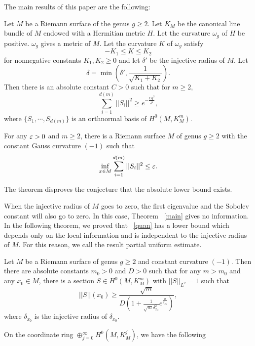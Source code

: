 The main results of this paper are the following:

\begin{theorem}\label{main}
Let $M$ be a Riemann surface of the genus $g\geq 2$. Let $K_M$ be the
canonical line  bundle of $M$ endowed with a Hermitian metric $H$. Let 
the curvature $\omega_g$ of $H$ be positive. $\omega_g$ gives a \ka
metric of $M$. Let the curvature $K$ of $\omega_g$ satisfy
\[
-K_1\leq K\leq K_2
\]
for nonnegative constants $K_1, K_2\geq 0$ and let $\delta'$ be the 
injective radius of $M$. Let
\[
\delta=\min(\delta',\frac{1}{\sqrt{K_1+K_2}}).
\]
Then there is an absolute constant $C>0$ such that for $m\geq 2$,
\[
\sum_{i=1}^{d(m)}||S_i||^2\geq  e^{-\frac{Cg^3}{\delta^6}},
\]
where $\{S_1,\cdots,S_{d(m)}\}$ is an orthnormal basis of $H^0(M,K_M^m)$.
\end{theorem}


\begin{theorem}\label{second}
For any $\varepsilon>0$ and $m\geq 2$, there is a Riemann surface
$M$
 of genus
$g\geq 2$ with the constant Gauss curvature $(-1)$ such that
\[
\inf_{x\in M}\sum_{i=1}^{d(m)}||S_i||^2\leq \varepsilon.
\]
\end{theorem}


The theorem disproves the conjecture that
the absolute lower bound exists.

When the injective radius of $M$ goes to zero, the first eigenvalue 
and the Sobolev constant will also go to zero. In this case, Theorem
~\ref{main} gives no information. In the following theorem, we proved that
~\eqref{quan} has a lower bound which depends only on the local
information and is independent to the injective radius of $M$. 
For this reason, we call the result partial uniform estimate. 

\begin{theorem}\label{third}
Let $M$ be a Riemann surface of genus $g\geq 2$ and constant curvature
$(-1)$. Then there are absolute constants $m_0>0$ and $D>0$ such that for
any $m>m_0$
and any $x_0\in M$, there is a section $S\in H^0(M,K_M^m)$ with
$||S||_{L^2}=1$ such that
\begin{equation}
||S||(x_0)\geq\frac{\sqrt m}{D(1+\frac{1}{\sqrt m\delta_{x_0}^2}
e^{\frac{\pi}{\delta_{x_0}}})},
\end{equation}
where $\delta_{x_0}$ is the injective radius of $\delta_{x_0}$.
\end{theorem}


On the coordinate ring $\oplus_{j=0}^{\infty}
H^0(M, K_M^j)$, we have the following

